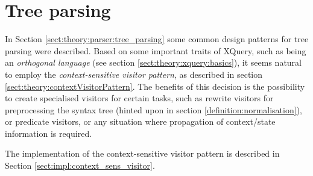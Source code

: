 \section{Tree parsing}
\label{sect:method:tree_parsing}
In Section \ref{sect:theory:parser:tree_parsing} some common design patterns
for tree parsing were described. Based on some important traits of XQuery, such
as being an \textit{orthogonal language} (see section
\ref{sect:theory:xquery:basics}), it seems natural to employ the
\textit{context-sensitive visitor pattern}, as described in section
\ref{sect:theory:contextVisitorPattern}. The benefits of this decision is the
possibility to create specialised visitors for certain tasks, such as rewrite
visitors for preprocessing the syntax tree (hinted upon in section
\ref{definition:normalisation}), or predicate visitors, or any situation where
propagation of context/state information is required.

The implementation of the context-sensitive visitor pattern is described in
Section \ref{sect:impl:context_sens_visitor}. 
